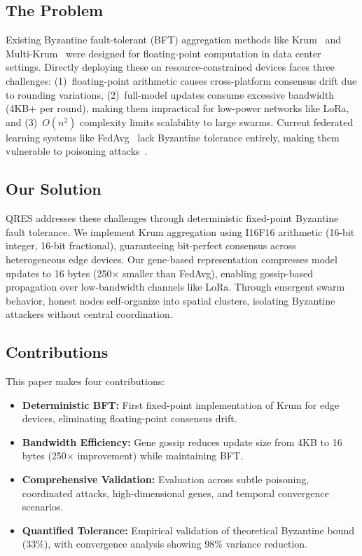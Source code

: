 \documentclass[conference,10pt]{IEEEtran}
\begin{document}
\subsection{The Problem}
Existing Byzantine fault-tolerant (BFT) aggregation methods like Krum~\cite{blanchard2017machine} and Multi-Krum~\cite{elmhamdi2018hidden} were designed for floating-point computation in data center settings. Directly deploying these on resource-constrained devices faces three challenges: (1)~floating-point arithmetic causes cross-platform consensus drift due to rounding variations, (2)~full-model updates consume excessive bandwidth (4KB+ per round), making them impractical for low-power networks like LoRa, and (3)~$O(n^2)$ complexity limits scalability to large swarms. Current federated learning systems like FedAvg~\cite{mcmahan2017communication} lack Byzantine tolerance entirely, making them vulnerable to poisoning attacks~\cite{bagdasaryan2020backdoor}.

\subsection{Our Solution}
QRES addresses these challenges through deterministic fixed-point Byzantine fault tolerance. We implement Krum aggregation using I16F16 arithmetic (16-bit integer, 16-bit fractional), guaranteeing bit-perfect consensus across heterogeneous edge devices. Our gene-based representation compresses model updates to 16 bytes (250$\times$ smaller than FedAvg), enabling gossip-based propagation over low-bandwidth channels like LoRa. Through emergent swarm behavior, honest nodes self-organize into spatial clusters, isolating Byzantine attackers without central coordination.

\subsection{Contributions}
This paper makes four contributions:
\begin{itemize}
    \item \textbf{Deterministic BFT:} First fixed-point implementation of Krum for edge devices, eliminating floating-point consensus drift.
    \item \textbf{Bandwidth Efficiency:} Gene gossip reduces update size from 4KB to 16 bytes (250$\times$ improvement) while maintaining BFT.
    \item \textbf{Comprehensive Validation:} Evaluation across subtle poisoning, coordinated attacks, high-dimensional genes, and temporal convergence scenarios.
    \item \textbf{Quantified Tolerance:} Empirical validation of theoretical Byzantine bound (33\%), with convergence analysis showing 98\% variance reduction.
\end{itemize}
\end{document}
